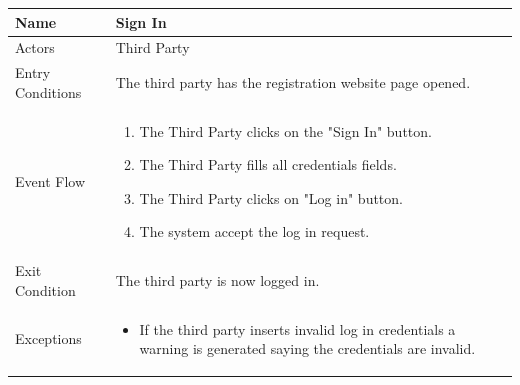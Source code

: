 \begin{enumerate}
\FloatBarrier
\begin{table}[h]
\begin{tabular}{|l|p{}|}
\hline
Name             & Sign In \\ \hline
Actors           & Third Party  \\ \hline
Entry Conditions & The third party has the registration website page opened.    \\ \hline
Event Flow       & \begin{enumerate}
            \item The Third Party clicks on the "Sign In" button.
            \item The Third Party fills all credentials fields. 
            \item The Third Party clicks on "Log in" button.
            \item The system accept the log in request.
        \end{enumerate}\\ \hline
Exit Condition   & The third party is now logged in.\\ \hline
Exceptions       & \begin{itemize}
\item If the third party inserts invalid log in credentials a warning is generated saying the credentials are invalid.
\end{itemize}\\ \hline
\end{tabular}
\end{table}
\FloatBarrier


\end{enumerate}
